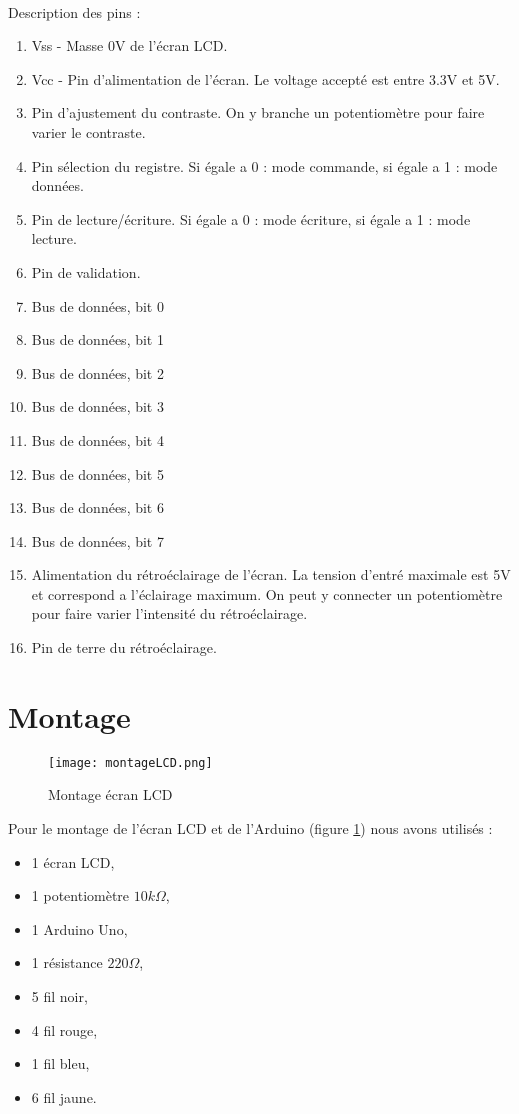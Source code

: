 \paragraph{}
	Description des pins :
    \begin{enumerate}[label=\arabic*]
    	\item Vss - Masse 0V de l'écran LCD.
		\item Vcc - Pin d'alimentation de l'écran. Le voltage accepté est entre 3.3V et 5V.
		\item Pin d'ajustement du contraste. On y branche un potentiomètre pour faire varier le contraste.
		\item Pin sélection du registre. Si égale a 0 : mode commande, si égale a 1 : mode données.
		\item Pin de lecture/écriture. Si égale a 0 : mode écriture, si égale a 1 : mode lecture.
		\item Pin de validation.
		\item Bus de données, bit 0
		\item Bus de données, bit 1
		\item Bus de données, bit 2
		\item Bus de données, bit 3
		\item Bus de données, bit 4
		\item Bus de données, bit 5
		\item Bus de données, bit 6
		\item Bus de données, bit 7
		\item Alimentation du rétroéclairage de l'écran. La tension d'entré maximale est 5V et correspond a l'éclairage maximum. On peut y connecter un potentiomètre pour faire varier l'intensité du rétroéclairage.
		\item Pin de terre du rétroéclairage.
    \end{enumerate}
    
\newpage
\section{Montage}
\begin{figure}[h]
	\centering
	\texttt{[image: montageLCD.png]}
    \caption{Montage écran LCD}
    \label{montageLCD}    
\end{figure}
Pour le montage de l'écran LCD et de l'Arduino (figure \ref{montageLCD}) nous avons utilisés :
\begin{itemize}
	\item 1 écran LCD,
    \item 1 potentiomètre $10k\Omega$,
    \item 1 Arduino Uno,
    \item 1 résistance $220\Omega$,
    \item 5 fil noir,
    \item 4 fil rouge,
    \item 1 fil bleu,
    \item 6 fil jaune.
\end{itemize}

